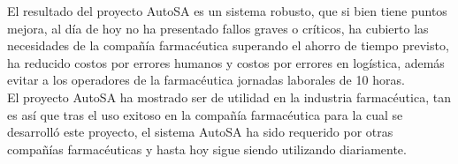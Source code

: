 El resultado del proyecto AutoSA es un sistema robusto, que si bien tiene puntos mejora, al día de hoy no ha presentado fallos graves o críticos, ha cubierto las necesidades de la compañía farmacéutica superando el ahorro de tiempo previsto, ha reducido costos por errores humanos y costos por errores en logística, además evitar a los operadores de la farmacéutica jornadas laborales de 10 horas.\\
El proyecto AutoSA ha mostrado ser de utilidad en la industria farmacéutica, tan es así que tras el uso exitoso en la compañía farmacéutica para la cual se desarrolló este proyecto, el sistema AutoSA ha sido requerido por otras compañías farmacéuticas y hasta hoy sigue siendo  utilizando diariamente.
